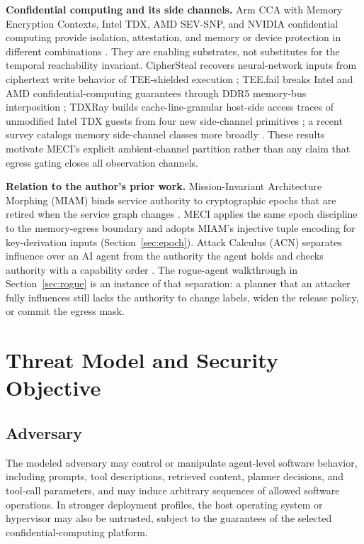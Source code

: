 \documentclass[11pt,letterpaper]{article}
\theoremstyle{plain}
\theoremstyle{definition}
\begin{document}
\textbf{Confidential computing and its side channels.} Arm CCA with Memory Encryption Contexts, Intel TDX, AMD SEV-SNP, and NVIDIA confidential computing provide isolation, attestation, and memory or device protection in different combinations \cite{armmec,inteltdx,amdsnp,nvidiablog}. They are enabling substrates, not substitutes for the temporal reachability invariant. CipherSteal recovers neural-network inputs from ciphertext write behavior of TEE-shielded execution \cite{ciphersteal}; TEE.fail breaks Intel and AMD confidential-computing guarantees through DDR5 memory-bus interposition \cite{teefail}; TDXRay builds cache-line-granular host-side access traces of unmodified Intel TDX guests from four new side-channel primitives \cite{tdxray}; a recent survey catalogs memory side-channel classes more broadly \cite{hassan2025}. These results motivate MECI's explicit ambient-channel partition rather than any claim that egress gating closes all observation channels.

\textbf{Relation to the author's prior work.} Mission-Invariant Architecture Morphing (MIAM) binds service authority to cryptographic epochs that are retired when the service graph changes \cite{miam}. MECI applies the same epoch discipline to the memory-egress boundary and adopts MIAM's injective tuple encoding for key-derivation inputs (Section~\ref{sec:epoch}). Attack Calculus (ACN) separates influence over an AI agent from the authority the agent holds and checks authority with a capability order \cite{acn}. The rogue-agent walkthrough in Section~\ref{sec:rogue} is an instance of that separation: a planner that an attacker fully influences still lacks the authority to change labels, widen the release policy, or commit the egress mask.

\section{Threat Model and Security Objective}\label{sec:threat}

\subsection{Adversary}
The modeled adversary may control or manipulate agent-level software behavior, including prompts, tool descriptions, retrieved content, planner decisions, and tool-call parameters, and may induce arbitrary sequences of allowed software operations. In stronger deployment profiles, the host operating system or hypervisor may also be untrusted, subject to the guarantees of the selected confidential-computing platform.
\end{document}
